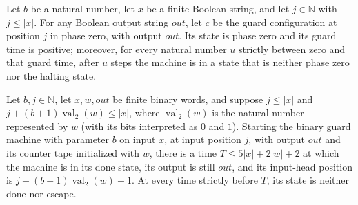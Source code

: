 \begin{lemma}
\label{Turing.MachineFormat.guardBlock_segment}
\leanok
{}
Let $b$ be a natural number, let $x$ be a finite Boolean string, and let $j\in\mathbb N$
with $j\le |x|$. For any Boolean output string $out$, let $c$ be the guard configuration
at position $j$ in phase zero, with output $out$. Its state is phase zero and its guard
time is positive; moreover, for every natural number $u$ strictly between zero and that
guard time, after $u$ steps the machine is in a state that is neither phase zero nor the
halting state.
\end{lemma}

\begin{lemma}
\label{Turing.MachineFormat.binaryGuard_done}
\leanok
{}
Let $b,j\in\mathbb{N}$, let $x,w,out$ be finite binary words, and suppose $j\leq |x|$
and $j+(b+1)\operatorname{val}_2(w)\leq |x|$, where $\operatorname{val}_2(w)$ is the
natural number represented by $w$ (with its bits interpreted as $0$ and $1$). Starting
the binary guard machine with parameter $b$ on input $x$, at input position $j$, with
output $out$ and its counter tape initialized with $w$, there is a time $T\leq
5|x|+2|w|+2$ at which the machine is in its done state, its output is still $out$, and
its input-head position is $j+(b+1)\operatorname{val}_2(w)+1$. At every time strictly
before $T$, its state is neither done nor escape.
\end{lemma}

